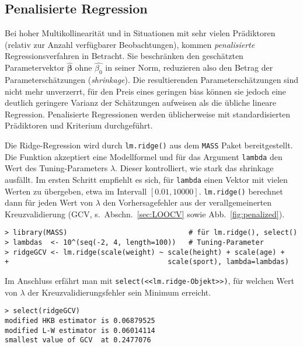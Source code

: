 \subsection{Penalisierte Regression}
\label{sec:lmPen}

Bei hoher Multikollinearität und in Situationen mit sehr vielen Prädiktoren (relativ zur Anzahl verfügbarer Beobachtungen), kommen \emph{penalisierte} Regressionsverfahren in Betracht. Sie beschränken den geschätzten Parametervektor $\hat{\bm{\beta}}$ ohne $\hat{\beta_{0}}$ in seiner Norm, reduzieren also den Betrag der Parameterschätzungen (\emph{shrinkage}). Die resultierenden Parameterschätzungen sind nicht mehr unverzerrt, für den Preis eines geringen bias können sie jedoch eine deutlich geringere Varianz der Schätzungen aufweisen als die übliche lineare Regression. Penalisierte Regressionen werden üblicherweise mit standardisierten Prädiktoren und Kriterium durchgeführt.

Die Ridge-Regression wird durch \lstinline!lm.ridge()! aus dem \lstinline!MASS! Paket \cite{Venables2002} bereitgestellt. Die Funktion akzeptiert eine Modellformel und für das Argument \lstinline!lambda! den Wert des Tuning-Parameters $\lambda$. Dieser kontrolliert, wie stark das shrinkage ausfällt. Im ersten Schritt empfiehlt es sich, für \lstinline!lambda! einen Vektor mit vielen Werten zu übergeben, etwa im Intervall $[0.01, 10000]$. \lstinline!lm.ridge()! berechnet dann für jeden Wert von $\lambda$ den Vorhersagefehler aus der verallgemeinerten Kreuzvalidierung (GCV, s.\ Abschn.\ \ref{sec:LOOCV} sowie Abb.\ \ref{fig:penalized}).
\begin{lstlisting}
> library(MASS)                             # für lm.ridge(), select()
> lambdas  <- 10^(seq(-2, 4, length=100))   # Tuning-Parameter
> ridgeGCV <- lm.ridge(scale(weight) ~ scale(height) + scale(age) +
+                                      scale(sport), lambda=lambdas)
\end{lstlisting}

Im Anschluss erfährt man mit \lstinline!select(<<lm.ridge-Objekt>>)!, für welchen Wert von $\lambda$ der Kreuzvalidierungsfehler sein Minimum erreicht.
\begin{lstlisting}
> select(ridgeGCV)
modified HKB estimator is 0.06879525
modified L-W estimator is 0.06014114
smallest value of GCV  at 0.2477076
\end{lstlisting}

